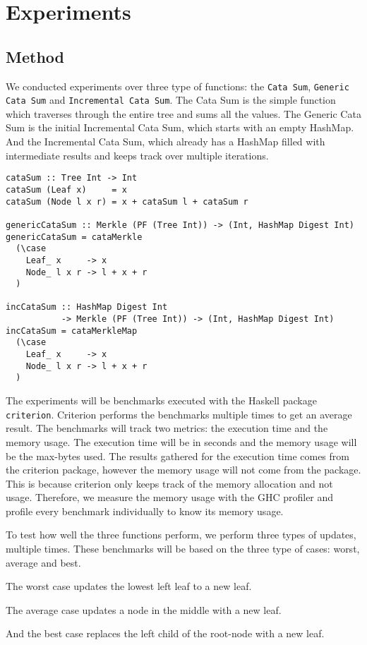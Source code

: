 \chapter{Experiments}

\section{Method}

We conducted experiments over three type of functions: the \texttt{Cata Sum}, \texttt{Generic Cata Sum} and \texttt{Incremental Cata Sum}. The Cata Sum is the simple function which traverses through the entire tree and sums all the values. The Generic Cata Sum is the initial Incremental Cata Sum, which starts with an empty HashMap. And the Incremental Cata Sum, which already has a HashMap filled with intermediate results and keeps track over multiple iterations.

\begin{verbatim}
cataSum :: Tree Int -> Int
cataSum (Leaf x)     = x
cataSum (Node l x r) = x + cataSum l + cataSum r

genericCataSum :: Merkle (PF (Tree Int)) -> (Int, HashMap Digest Int)
genericCataSum = cataMerkle
  (\case
    Leaf_ x     -> x
    Node_ l x r -> l + x + r
  )

incCataSum :: HashMap Digest Int 
           -> Merkle (PF (Tree Int)) -> (Int, HashMap Digest Int)
incCataSum = cataMerkleMap
  (\case
    Leaf_ x     -> x
    Node_ l x r -> l + x + r
  )
\end{verbatim}

The experiments will be benchmarks executed with the Haskell package \texttt{criterion}\cite{hackage2022criterion}. Criterion performs the benchmarks multiple times to get an average result. The benchmarks will track two metrics: the execution time and the memory usage. The execution time will be in seconds and the memory usage will be the max-bytes used. The results gathered for the execution time comes from the criterion package, however the memory usage will not come from the package. This is because criterion only keeps track of the memory allocation and not usage. Therefore, we measure the memory usage with the GHC profiler\cite*{ghc2022memoryprofiling} and profile every benchmark individually to know its memory usage.

To test how well the three functions perform, we perform three types of updates, multiple times. These benchmarks will be based on the three type of cases: worst, average and best.
\begin{enumerate*}[label=(\arabic*)]
  \item The worst case updates the lowest left leaf to a new leaf.
  \item The average case updates a node in the middle with a new leaf.
  \item And the best case replaces the left child of the root-node with a new leaf.
\end{enumerate*}

